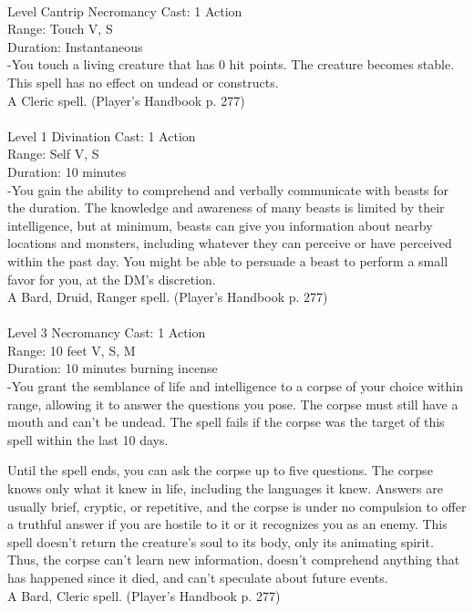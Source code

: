 \documentclass[10pt,twocolumn]{report}
\begin{document}
 \\
Level Cantrip \quad Necromancy \quad Cast: 1 Action\\
Range: Touch \quad V, S\\
Duration: Instantaneous \quad \\
-You touch a living creature that has 0 hit points. The creature becomes stable. This spell has no effect on undead or constructs.\\
A Cleric spell. (Player's Handbook p. 277) \\


 \\
Level 1 \quad Divination \quad Cast: 1 Action\\
Range: Self \quad V, S\\
Duration: 10 minutes \quad \\
-You gain the ability to comprehend and verbally communicate with beasts for the duration.
The knowledge and awareness of many beasts is limited by their intelligence, but at minimum, beasts can give you information about nearby locations and monsters, including whatever they can perceive or have perceived within the past day. You might be able to persuade a beast to perform a small favor for you, at the DM’s discretion.\\
A Bard, Druid, Ranger spell. (Player's Handbook p. 277) \\


 \\
Level 3 \quad Necromancy \quad Cast: 1 Action\\
Range: 10 feet \quad V, S, M\\
Duration: 10 minutes \quad burning incense\\
-You grant the semblance of life and intelligence to a corpse of your choice within range, allowing it to answer the questions you pose. The corpse must still have a mouth and can’t be undead. The spell fails if the corpse was the target of this spell within the last 10 days.

Until the spell ends, you can ask the corpse up to five questions. The corpse knows only what it knew in life, including the languages it knew. Answers are usually brief, cryptic, or repetitive, and the corpse is under no compulsion to offer a truthful answer if you are hostile to it or it recognizes you as an enemy. This spell doesn’t return the creature’s soul to its body, only its animating spirit. Thus, the corpse can’t learn new information, doesn’t comprehend anything that has happened since it died, and can’t speculate about future events.\\
A Bard, Cleric spell. (Player's Handbook p. 277) \\
\end{document}
